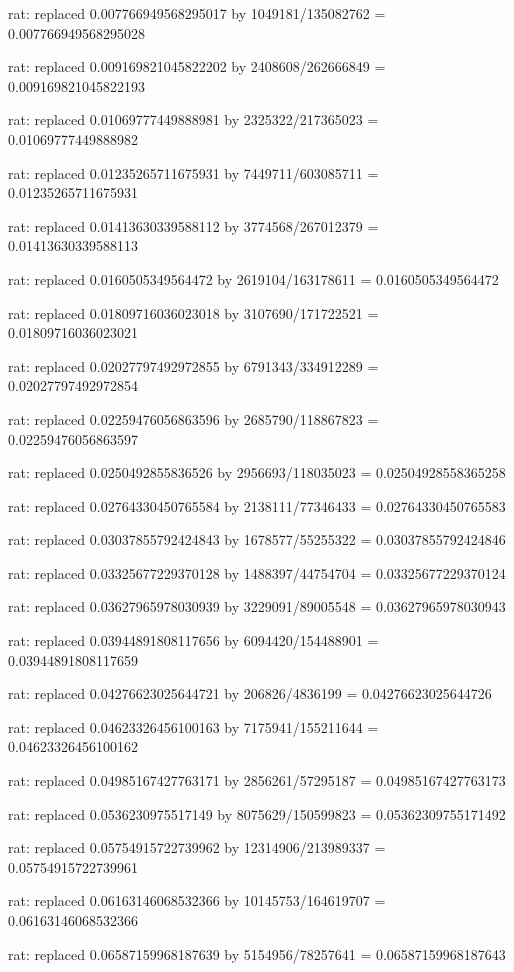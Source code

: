 \documentclass[a4paper,10pt]{article}
\begin{document}
\begin{eulernotebook}
\begin{eulercomment}
\begin{eulercomment}
\begin{eulercomment}
\begin{eulercomment}
\begin{eulercomment}
\begin{eulercomment}
\begin{eulercomment}
\begin{eulercomment}
\begin{eulercomment}
\begin{eulercomment}
\begin{eulercomment}
\begin{eulercomment}
\begin{eulercomment}
\begin{eulercomment}
\begin{eulercomment}
\begin{eulercomment}
\begin{euleroutput}
  rat: replaced 0.007766949568295017 by 1049181/135082762 = 0.007766949568295028
  
  rat: replaced 0.009169821045822202 by 2408608/262666849 = 0.009169821045822193
  
  rat: replaced 0.01069777449888981 by 2325322/217365023 = 0.01069777449888982
  
  rat: replaced 0.01235265711675931 by 7449711/603085711 = 0.01235265711675931
  
  rat: replaced 0.01413630339588112 by 3774568/267012379 = 0.01413630339588113
  
  rat: replaced 0.0160505349564472 by 2619104/163178611 = 0.0160505349564472
  
  rat: replaced 0.01809716036023018 by 3107690/171722521 = 0.01809716036023021
  
  rat: replaced 0.02027797492972855 by 6791343/334912289 = 0.02027797492972854
  
  rat: replaced 0.02259476056863596 by 2685790/118867823 = 0.02259476056863597
  
  rat: replaced 0.0250492855836526 by 2956693/118035023 = 0.02504928558365258
  
  rat: replaced 0.02764330450765584 by 2138111/77346433 = 0.02764330450765583
  
  rat: replaced 0.03037855792424843 by 1678577/55255322 = 0.03037855792424846
  
  rat: replaced 0.03325677229370128 by 1488397/44754704 = 0.03325677229370124
  
  rat: replaced 0.03627965978030939 by 3229091/89005548 = 0.03627965978030943
  
  rat: replaced 0.03944891808117656 by 6094420/154488901 = 0.03944891808117659
  
  rat: replaced 0.04276623025644721 by 206826/4836199 = 0.04276623025644726
  
  rat: replaced 0.04623326456100163 by 7175941/155211644 = 0.04623326456100162
  
  rat: replaced 0.04985167427763171 by 2856261/57295187 = 0.04985167427763173
  
  rat: replaced 0.0536230975517149 by 8075629/150599823 = 0.05362309755171492
  
  rat: replaced 0.05754915722739962 by 12314906/213989337 = 0.05754915722739961
  
  rat: replaced 0.06163146068532366 by 10145753/164619707 = 0.06163146068532366
  
  rat: replaced 0.06587159968187639 by 5154956/78257641 = 0.06587159968187643
  

\end{euleroutput}
\end{eulercomment}
\end{eulercomment}
\end{eulercomment}
\end{eulercomment}
\end{eulercomment}
\end{eulercomment}
\end{eulercomment}
\end{eulercomment}
\end{eulercomment}
\end{eulercomment}
\end{eulercomment}
\end{eulercomment}
\end{eulercomment}
\end{eulercomment}
\end{eulercomment}
\end{eulercomment}
\end{eulernotebook}
\end{document}
